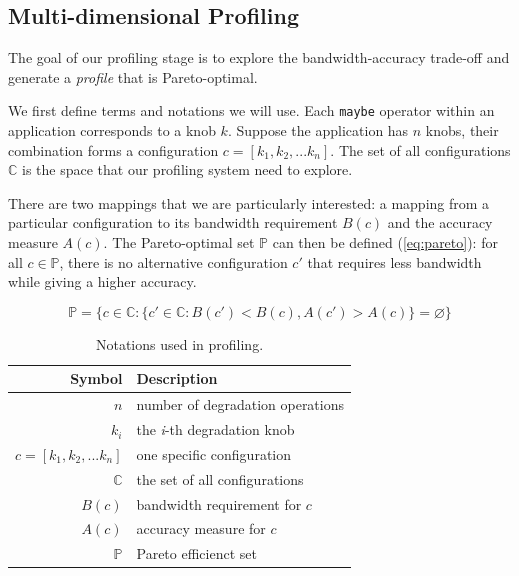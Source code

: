 \subsection{Multi-dimensional Profiling}
\label{sec:profiling}

The goal of our profiling stage is to explore the bandwidth-accuracy trade-off
and generate a \textit{profile} that is Pareto-optimal.

We first define terms and notations we will use. Each \texttt{maybe} operator
within an application corresponds to a knob $k$. Suppose the application has $n$
knobs, their combination forms a configuration $c = [k_{1}, k_{2},
... k_{n}]$. The set of all configurations $\mathbb{C}$ is the space that our
profiling system need to explore.

There are two mappings that we are particularly interested: a mapping from a
particular configuration to its bandwidth requirement $B(c)$ and the accuracy
measure $A(c)$. The Pareto-optimal set $\mathbb{P}$ can then be defined
(\autoref{eq:pareto}): for all $c \in \mathbb{P}$, there is no alternative
configuration $c'$ that requires less bandwidth while giving a higher accuracy.

{\small
\begin{equation}
  \mathbb{P} = \{ c \in \mathbb{C} : \{ c' \in \mathbb{C}: B(c') < B(c),
  A(c') > A(c) \} = \varnothing\}
  \label{eq:pareto}
\end{equation}
}%

\begin{table}
  \centering
  \begin{tabular}{r l}
    \toprule
    \textbf{Symbol} & \textbf{Description} \\
    \midrule
    $n$ & number of degradation operations \\
    $k_i$ & the \textit{i}-th degradation knob \\
    $c = [k_{1}, k_{2}, ... k_{n}]$ & one specific configuration \\
    $\mathbb{C}$ & the set of all configurations \\
    \midrule
    $B(c)$ & bandwidth requirement for $c$ \\
    $A(c)$ & accuracy measure for $c$ \\
    $\mathbb{P}$ & Pareto efficienct set \\
    \bottomrule
  \end{tabular}
  \caption{Notations used in profiling.}
  \label{tab:notations}
\end{table}


